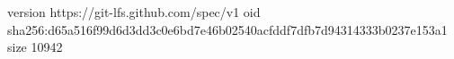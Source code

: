 version https://git-lfs.github.com/spec/v1
oid sha256:d65a516f99d6d3dd3c0e6bd7e46b02540acfddf7dfb7d94314333b0237e153a1
size 10942
